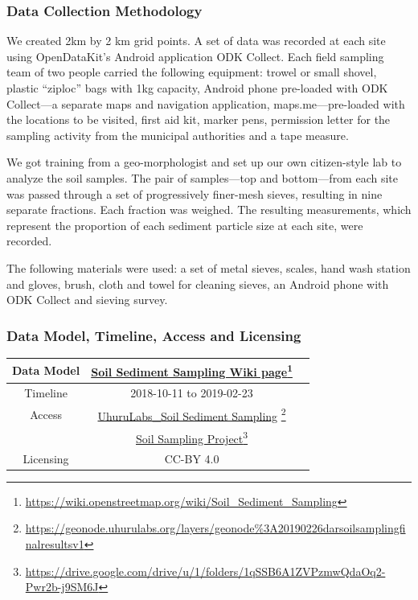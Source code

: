 \documentclass[a4paper,12pt,twoside]{article}
\begin{document}
\subsubsection{Data Collection Methodology}

\begin{multicols}{2}
We created 2km by 2 km grid points. A set of data was recorded at each site using OpenDataKit’s Android application ODK Collect. Each field sampling team of two people carried the following equipment: trowel or small shovel, plastic “ziploc” bags with 1kg capacity, Android phone pre-loaded with ODK Collect---a separate maps and navigation application, maps.me---pre-loaded with the locations to be visited, first aid kit, marker pens, permission letter for the sampling activity from the municipal authorities and a tape measure. 

We got training from a geo-morphologist and set up our own citizen-style lab to analyze the soil samples. The pair of samples—top and bottom—from each site was passed through a set of progressively finer-mesh sieves, resulting in nine separate fractions. Each fraction was weighed. The resulting measurements, which represent the proportion of each sediment particle size at each site, were
recorded.

The following materials were used: a set of metal sieves, scales, hand wash station and gloves, brush, cloth and towel for cleaning sieves, an Android phone with ODK Collect and sieving survey.
\end{multicols}

\subsubsection{Data Model, Timeline, Access and Licensing}
\begin{center}
  \begin{tabular}{|c|c|c|}  
 \hline
    Data Model    &   \href{https://wiki.openstreetmap.org/wiki/Soil_Sediment_Sampling}{Soil Sediment Sampling Wiki page}\footnote{\url{https://wiki.openstreetmap.org/wiki/Soil_Sediment_Sampling}} \\
 \hline
   Timeline  &   2018-10-11 to 2019-02-23 \\
 \hline  
 Access  & 
    \href{https://geonode.uhurulabs.org/layers/geonode\%3A_2019_02_26_dar_soil_sampling_final_results_v1}{UhuruLabs\_Soil Sediment Sampling} \footnote{\url{https://geonode.uhurulabs.org/layers/geonode\%3A20190226darsoilsamplingfinalresultsv1}}\\
{} & \href{https://drive.google.com/drive/u/1/folders/1qSSB6A1ZVPzmwQdaOq2-Pwr2b-j9SM6J}{Soil Sampling Project}\footnote{\url{https://drive.google.com/drive/u/1/folders/1qSSB6A1ZVPzmwQdaOq2-Pwr2b-j9SM6J}}\\ \hline
Licensing &  CC-BY 4.0 \\
 \hline
  
\end{tabular}
\end{center}
\end{document}
